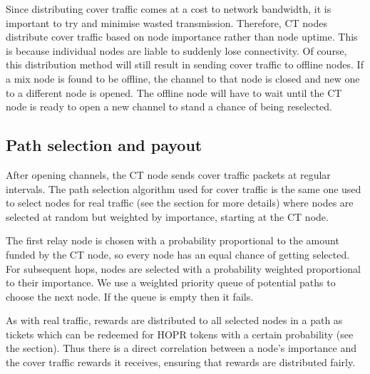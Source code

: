 Since distributing cover traffic comes at a cost to network bandwidth, it is important to try and minimise wasted transmission. Therefore, CT nodes distribute cover traffic based on node importance rather than node uptime. This is because individual nodes are liable to suddenly lose connectivity. Of course, this distribution method will still result in sending cover traffic to offline nodes. If a mix node is found to be offline, the channel to that node is closed and new one to a different node is opened. The offline node will have to wait until the CT node is ready to open a new channel to stand a chance of being reselected.

\subsection{Path selection and payout}
After opening channels, the CT node sends cover traffic packets at regular intervals. The path selection algorithm used for cover traffic is the same one used to select nodes for real traffic (see the  section for more details) where nodes are selected at random but weighted by importance, starting at the CT node.

The first relay node is chosen with a probability proportional to the amount funded by the CT node, so every node has an equal chance of getting selected. For subsequent hops, nodes are selected with a probability weighted proportional to their importance. We use a weighted priority queue of potential paths to choose the next node. If the queue is empty then it fails.

As with real traffic, rewards are distributed to all selected nodes in a path as tickets which can be redeemed for HOPR tokens with a certain probability (see the  section). Thus there is a direct correlation between a node's importance and the cover traffic rewards it receives, ensuring that rewards are distributed fairly.


